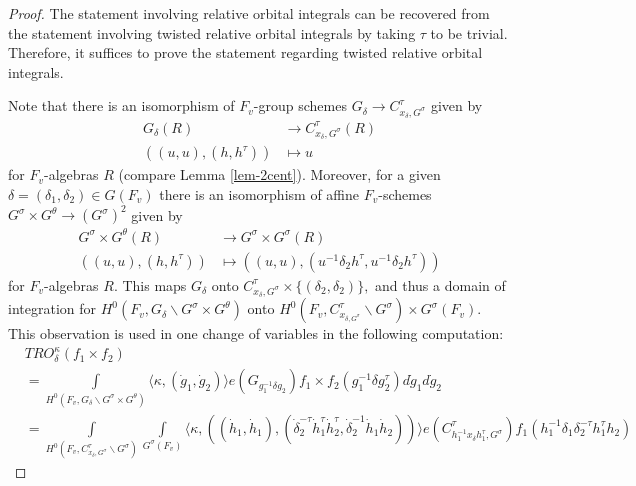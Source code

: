 \documentclass[12pt]{amsart}
\theoremstyle{remark}
\numberwithin{equation}{section}
\theoremstyle{definition}
\numberwithin{equation}{subsection}
\begin{document}
\begin{proof}
The statement involving relative orbital integrals can be recovered from the statement involving twisted relative orbital integrals by taking $\tau$ to be trivial.  Therefore, it suffices to prove the statement regarding twisted relative orbital integrals.

Note that there is an isomorphism of
$F_{v}$-group schemes $G_{\delta} \to C^{\tau}_{x_{\delta},G^{\sigma}}$ given
by
\begin{align}\label{third}
G_{\delta}(R) & \longrightarrow
C^{\tau}_{x_{\delta}, G^{\sigma}}(R) \\
((u,u), (h, h^{\tau})) & \longmapsto  u \nonumber
\end{align}
for $F_v$-algebras $R$ (compare Lemma \ref{lem-2cent}).
Moreover, for a given $\delta = (\delta_{1}, \delta_{2}) \in
G(F_{v})$ there is an isomorphism of affine $F_v$-schemes
$G^{\sigma} \times G^{\theta} \to (G^{\sigma})^2$ given by
\begin{align}\label{fourth}
G^{\sigma} \times G^{\theta}(R) & \longrightarrow  G^{\sigma}
\times G^{\sigma}(R) \\
((u,u), (h, h^{\tau})) & \longmapsto
((u,u), (u^{-1} \delta_{2} h^{\tau}, u^{-1} \delta_{2} h^{\tau}))
\nonumber
\end{align}
for $F_v$-algebras $R$.
This maps $G_{\delta}$ onto $C^{\tau}_{x_{\delta},
G^{\sigma}} \times \{ (\delta_{2}, \delta_{2})\},$ and thus a domain of
integration for $H^{0}(F_{v}, G_{\delta} \backslash
G^{\sigma} \times G^{\theta})$ onto $H^{0}(F_{v},
C^{\tau}_{x_{\delta, G^{\sigma}}} \backslash G^{\sigma}) \times
G^{\sigma}(F_{v}).$   This observation is used in one change of variables in the following computation:
\begin{align} \label{123}
&TRO^{\kappa}_{\delta}(f_1 \times f_2)\\
& = \nonumber
\int\limits_{H^{0}(F_{v}, G_{\delta} \backslash
G^{\sigma} \times G^{\theta})}
\langle \kappa, (\dot{g}_{1}, \dot{g}_{2}) \rangle
e(G_{g_{1}^{-1} \delta g_{2}})
f_{1} \times f_{2}(g_{1}^{-1} \delta
g_{2}^{\tau}) d \dot{g}_{1} d\dot{g}_{2} \\ \nonumber
& =
\int\limits_{H^{0}(F_{v}, C^{\tau}_{x_{\delta}, G^{\sigma}} \backslash
G^{\sigma})}
\int\limits_{G^{\sigma} (F_{v})}
\langle \kappa, ((\dot{h}_1,\dot{h}_1),(\dot{\delta}_2^{-\tau} \dot{h}_1^{\tau}\dot{h}_2^{\tau},\dot{\delta}_2^{-1} \dot{h}_1\dot{h}_2)) \rangle
e(C^{\tau}_{h_{1}^{-1} x_{\delta} h^{\tau}_{1}, G^{\sigma}})
f_{1}(h_{1}^{-1} \delta_{1} \delta_{2}^{- \tau} h_{1}^{\tau} h_{2})

\end{align}
\end{proof}
\end{document}
